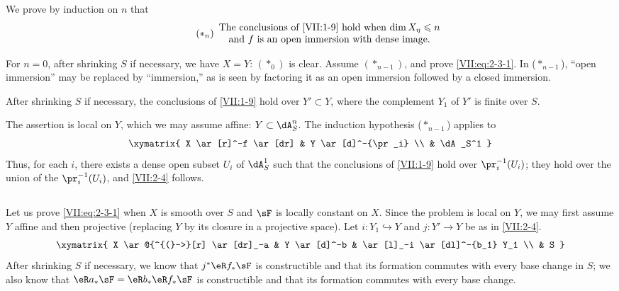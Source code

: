 \documentclass[oneside]{book}
\begin{document}
We prove by induction on $n$ that
\begin{equation*}\tag{$\ast_n$}\label{VII:eq:2-3-1}
  \begin{array}{c}
    \text{The conclusions of \ref{VII:1-9} hold when $\dim{X_\eta}\leqslant n$} \\
    \text{and $f$ is an open immersion with dense image.}
  \end{array}
\end{equation*}

For $n=0$, after shrinking $S$ if necessary, we have $X=Y$: $(\ast_0)$ is
clear. Assume $(\ast_{n-1})$, and prove \eqref{VII:eq:2-3-1}. In
($\ast_{n-1}$), ``open immersion'' may be replaced by ``immersion,'' as is
seen by factoring it as an open immersion followed by a closed immersion.





\begin{lemma_}\label{VII:2-4}
After shrinking $S$ if necessary, the conclusions of \ref{VII:1-9} hold over
$Y'\subset Y$, where the complement $Y_1$ of $Y'$ is finite over $S$.
\end{lemma_}

The assertion is local on $Y$, which we may assume affine:
$Y\subset \dA_S^n$. The induction hypothesis ($\ast_{n-1}$) applies to
\[\xymatrix{
  X \ar[r]^-f \ar[dr] 
    & Y \ar[d]^-{\pr_i} \\
  & \dA_S^1 
}\]
Thus, for each $i$, there exists a dense open subset $U_i$ of $\dA_S^1$ such
that the conclusions of \ref{VII:1-9} hold over $\pr_i^{-1}(U_i)$; they hold
over the union of the $\pr_i^{-1}(U_i)$, and \ref{VII:2-4} follows.





\addtocounter{subsection}{1} %
\subsection{}\label{VII:2-6}

Let us prove \eqref{VII:eq:2-3-1} when $X$ is smooth over $S$ and $\sF$ is
locally constant on $X$. Since the problem is local on $Y$, we may first
assume $Y$ affine and then projective (replacing $Y$ by its closure in a
projective space). Let $i:Y_1\hookrightarrow Y$ and $j:Y' \to Y$ be as in
\ref{VII:2-4}.
\[\xymatrix{
  X \ar@{^{(}->}[r] \ar[dr]_-a 
    & Y \ar[d]^-b 
    & \ar[l]_-i \ar[dl]^-{b_1} Y_1 \\
  & S 
}\] 
After shrinking $S$ if necessary, we know that $j^\ast \eR f_\ast \sF$ is
constructible and that its formation commutes with every base change in $S$;
we also know that $\eR a_\ast \sF = \eR b_\ast \eR f_\ast \sF$ is
constructible and that its formation commutes with every base change.
\end{document}
